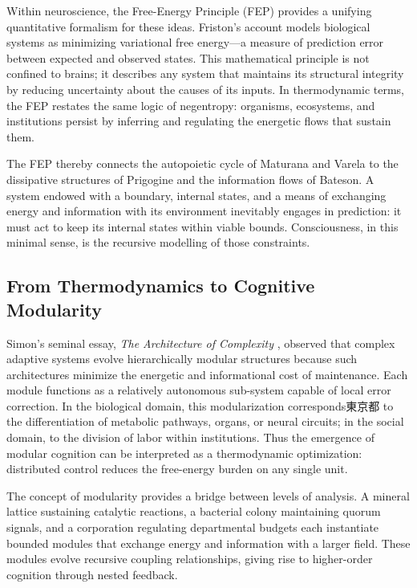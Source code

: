 \documentclass[11pt,a4paper]{article}
\begin{document}
Within neuroscience, the Free-Energy Principle (FEP) provides a unifying quantitative formalism for these ideas.  Friston’s account \citep{Friston2010FreeEnergyPrinciple} models biological systems as minimizing variational free energy---a measure of prediction error between expected and observed states.  This mathematical principle is not confined to brains; it describes any system that maintains its structural integrity by reducing uncertainty about the causes of its inputs.  In thermodynamic terms, the FEP restates the same logic of negentropy: organisms, ecosystems, and institutions persist by inferring and regulating the energetic flows that sustain them.  

The FEP thereby connects the autopoietic cycle of Maturana and Varela to the dissipative structures of Prigogine and the information flows of Bateson.  A system endowed with a boundary, internal states, and a means of exchanging energy and information with its environment inevitably engages in prediction: it must act to keep its internal states within viable bounds.  Consciousness, in this minimal sense, is the recursive modelling of those constraints.

\subsection{From Thermodynamics to Cognitive Modularity}

Simon’s seminal essay, \emph{The Architecture of Complexity} \citep{Simon1962ArchitectureComplexity}, observed that complex adaptive systems evolve hierarchically modular structures because such architectures minimize the energetic and informational cost of maintenance.  Each module functions as a relatively autonomous sub-system capable of local error correction.  In the biological domain, this modularization corresponds東京都 to the differentiation of metabolic pathways, organs, or neural circuits; in the social domain, to the division of labor within institutions.  Thus the emergence of modular cognition can be interpreted as a thermodynamic optimization: distributed control reduces the free-energy burden on any single unit.

The concept of modularity provides a bridge between levels of analysis.  A mineral lattice sustaining catalytic reactions, a bacterial colony maintaining quorum signals, and a corporation regulating departmental budgets each instantiate bounded modules that exchange energy and information with a larger field.  These modules evolve recursive coupling relationships, giving rise to higher-order cognition through nested feedback.
\end{document}
